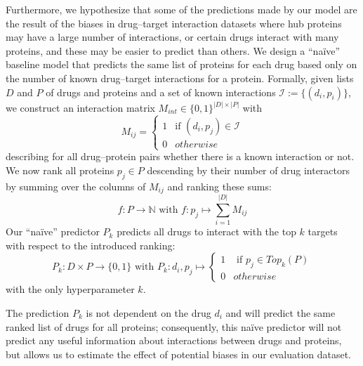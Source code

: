 \documentclass{bioinfo}
\begin{document}
Furthermore, we hypothesize that some of the predictions made by our
model are the result of the biases in drug--target interaction
datasets where hub proteins may have a large number of interactions,
or certain drugs interact with many proteins, and these may be easier
to predict than others. We design a ``na\"ive'' baseline model that
predicts the same list of proteins for each drug based only on the
number of known drug--target interactions for a protein. Formally,
given lists $D$ and $P$ of drugs and proteins and a set of known
interactions $\mathcal{I} := \{(d_i, p_i) \}$, we construct an
interaction matrix $M_{int}\in\{0,1\}^{|D|\times|P|}$ with
\begin{equation*}
	M_{ij} = \begin{cases}
		1 & \text{if } (d_i, p_j)\in \mathcal{I}\\
		0 & otherwise
	\end{cases}
\end{equation*}
describing for all drug--protein pairs whether there is a known
interaction or not. We now rank all proteins $p_j\in P$ descending by
their number of drug interactors by summing over the columns of
$M_{ij}$ and ranking these sums:
\begin{equation*}
	f: P \rightarrow \mathbb{N} \text{ with } f:p_j \mapsto \sum_{i=1}^{|D|}M_{ij}
\end{equation*}
Our ``na\"ive'' predictor $P_k$ predicts all drugs to interact with
the top $k$ targets with respect to the introduced ranking:
\begin{equation*}
	P_k: D\times P \rightarrow \{0,1\} \text{ with } P_k: d_i, p_j \mapsto \begin{cases}
		1 & \text{ if }p_j \in Top_{k}(P)\\
		0 & otherwise
	\end{cases}
\end{equation*}
with the only hyperparameter $k$.

The prediction $P_k$ is not dependent on the drug $d_i$ and will
predict the same ranked list of drugs for all proteins; consequently,
this na\"ive predictor will not predict any useful information about
interactions between drugs and proteins, but allows us to estimate the
effect of potential biases in our evaluation dataset.
\end{document}

